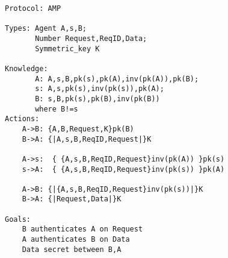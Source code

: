 \begin{lstlisting}[language=AnB, label={lst:ampfix}, caption=AnB code for fixed AMP protocol]
Protocol: AMP

Types: Agent A,s,B;
       Number Request,ReqID,Data;
       Symmetric_key K

Knowledge: 
       A: A,s,B,pk(s),pk(A),inv(pk(A)),pk(B);
       s: A,s,pk(s),inv(pk(s)),pk(A);
       B: s,B,pk(s),pk(B),inv(pk(B))
       where B!=s
Actions:
	A->B: {A,B,Request,K}pk(B) 
	B->A: {|A,s,B,ReqID,Request|}K

	A->s:  { {A,s,B,ReqID,Request}inv(pk(A)) }pk(s) 
	s->A:  { {A,s,B,ReqID,Request}inv(pk(s)) }pk(A)

	A->B: {|{A,s,B,ReqID,Request}inv(pk(s))|}K
	B->A: {|Request,Data|}K

Goals:
	B authenticates A on Request
	A authenticates B on Data
	Data secret between B,A	
\end{lstlisting}
